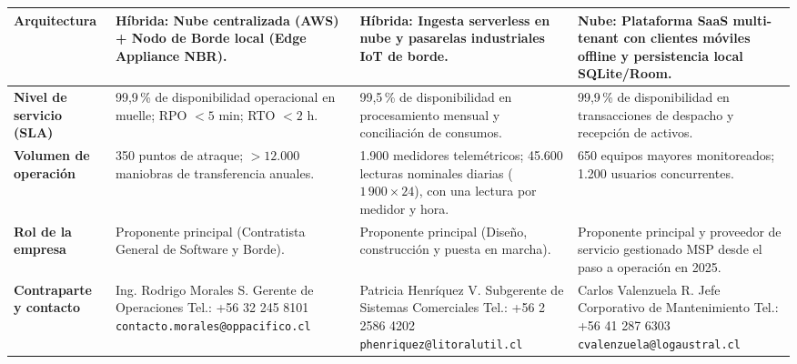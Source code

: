 \documentclass[11pt,letterpaper]{report}
\begin{document}
\begin{longtable}{L{\dimexpr.19\tabcolsep\relax}L{\dimexpr.27\tabcolsep\relax}L{\dimexpr.27\tabcolsep\relax}L{\dimexpr.27\tabcolsep\relax}}
    \\
    \hline
    \textbf{Arquitectura} &
    Híbrida: Nube centralizada (AWS) + Nodo de Borde local
    (Edge Appliance NBR). &
    Híbrida: Ingesta serverless en nube y pasarelas industriales
    IoT de borde. &
    Nube: Plataforma SaaS multi-tenant con clientes móviles offline
    y persistencia local SQLite/Room. \\
    \hline
    \textbf{Nivel de servicio (SLA)} &
    99,9\,\% de disponibilidad operacional en muelle;
    RPO $< 5$ min; RTO $< 2$ h. &
    99,5\,\% de disponibilidad en procesamiento mensual y
    conciliación de consumos. &
    99,9\,\% de disponibilidad en transacciones de despacho y
    recepción de activos. \\
    \hline
    \textbf{Volumen de operación} &
    350 puntos de atraque; $> 12.000$ maniobras de transferencia
    anuales. &
    1.900 medidores telemétricos; 45.600 lecturas nominales diarias
    ($1\,900\times24$), con una lectura por medidor y hora. &
    650 equipos mayores monitoreados; 1.200 usuarios concurrentes.
    \\
    \hline
    \textbf{Rol de la empresa} &
    Proponente principal (Contratista General de Software y Borde). &
    Proponente principal (Diseño, construcción y puesta en marcha). &
    Proponente principal y proveedor de servicio gestionado MSP
    desde el paso a operación en 2025.
    \\
    \hline
    \textbf{Contraparte y contacto} &
    Ing. Rodrigo Morales S.\newline
    Gerente de Operaciones\newline
    Tel.: +56 32 245 8101\newline
    \nolinkurl{contacto.morales@oppacifico.cl} &
    Patricia Henríquez V.\newline
    Subgerente de Sistemas Comerciales\newline
    Tel.: +56 2 2586 4202\newline
    \nolinkurl{phenriquez@litoralutil.cl} &
    Carlos Valenzuela R.\newline
    Jefe Corporativo de Mantenimiento\newline
    Tel.: +56 41 287 6303\newline
    \nolinkurl{cvalenzuela@logaustral.cl} \\
    \hline
\end{longtable}
\end{document}
